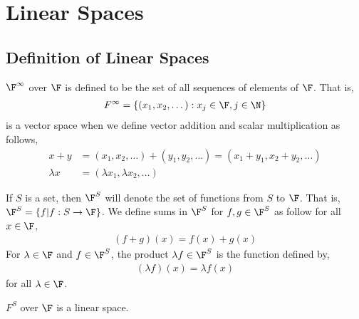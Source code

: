 \documentclass{article}
\begin{document}
\author{Ali Geisa}
\tableofcontents

\section{Linear Spaces}
\subsection{Definition of Linear Spaces}
  \begin{example}
    $\F^\infty$ over $\F$ is defined to be the set of all sequences of elements of $\F$. That is,
    \begin{align*}
      F^{\infty} = \{(x_1, x_2, \dots): x_j \in \F, j \in \N\}
    \end{align*}
    is a vector space when we define vector addition and scalar multiplication as follows,
    \begin{align*}
      x + y & = (x_1, x_2, \dots) + (y_1, y_2, \dots) = (x_1 + y_1, x_2 + y_2, \dots) \\
      \lambda x & = (\lambda x_1, \lambda x_2, \dots)
    \end{align*}
  \end{example}
  \begin{example}
    If $S$ is a set, then $\F^S$ will denote the set of functions from $S$ to $\F$. That is, $\F^S = \{f| f: S \to \F\}$. We define sums in $\F^S$ for $f, g \in \F^S$ as follow
    for all $x \in \F$,
    \begin{align*}
      (f + g)(x) = f(x) + g(x)
    \end{align*}
    For $\lambda \in \F$ and $f \in \F^S$, the product $\lambda f \in \F^S$ is the function defined by,
    \begin{align*}
      (\lambda f)(x) = \lambda f(x)
    \end{align*}
    for all $\lambda \in \F$.
  \end{example}
  \begin{prop}
    $F^S$ over $\F$ is a linear space.
  \end{prop}
\end{document}

